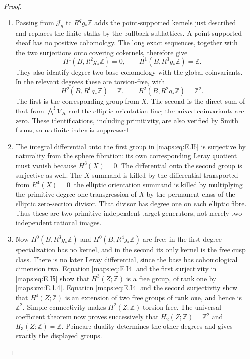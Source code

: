 \begin{proof}
\begin{enumerate}[label=\arabic*.,leftmargin=*]
\item Passing from \(\mathcal J_q\) to \(R^qg_*\mathbb Z\)
adds the point-supported kernels just described and replaces
the finite stalks by the pullback sublattices. A point-supported
sheaf has no positive cohomology. The long exact sequences,
together with the two surjections onto covering cokernels,
therefore give
\[
 H^1(B,R^2g_*\mathbb Z)=0,\qquad
 H^1(B,R^3g_*\mathbb Z)=\mathbb Z.
 \tag{E.I4}\label{maps:eq:E.I4}
\]
They also identify degree-two base cohomology with the global
coinvariants. In the relevant degrees these are torsion-free,
with
\[
 H^2(B,R^1g_*\mathbb Z)=\mathbb Z,
 \qquad H^2(B,R^2g_*\mathbb Z)=\mathbb Z^2.
 \tag{E.I5}\label{maps:eq:E.I5}
\]
The first is the corresponding group from \(X\). The second
is the direct sum of that from \(\bigwedge^2\mathcal V_X\)
and the elliptic orientation line; the mixed coinvariants are
zero. These identifications, including primitivity, are also
verified by Smith forms, so no finite index is suppressed.

\item The integral differential onto the first group in \eqref{maps:eq:E.I5} is
surjective by naturality from the sphere fibration: its own
corresponding Leray quotient must vanish because \(H^3(X)=0\).
The differential onto the second group is surjective as well.
The \(X\) summand is killed by the differential transported
from \(H^4(X)=0\); the elliptic orientation summand is killed
by multiplying the primitive degree-one transgression of \(X\)
by the permanent class of the elliptic zero-section divisor.
That divisor has degree one on each elliptic fibre. Thus these
are two primitive independent target generators, not merely two
independent rational images.

\item Now \(H^0(B,R^3g_*\mathbb Z)\) and
\(H^0(B,R^4g_*\mathbb Z)\) are free: in the first degree
specialization has no kernel, and in the second its only
kernel is the free cusp class. There is no later Leray
differential, since the base has cohomological dimension two.
Equation \eqref{maps:eq:E.I4} and the first surjectivity in \eqref{maps:eq:E.I5} show that
\(H^3(Z;\mathbb Z)\) is a free group, of rank one by \ref{maps:src:E.1.4}.
Equation \eqref{maps:eq:E.I4} and the second surjectivity show that
\(H^4(Z;\mathbb Z)\) is an extension of two free groups of
rank one, and hence is \(\mathbb Z^2\).
Simple connectivity makes \(H^2(Z;\mathbb Z)\) torsion free.
The universal coefficient theorem now proves successively that
\(H_2(Z;\mathbb Z)=\mathbb Z^2\) and
\(H_3(Z;\mathbb Z)=\mathbb Z\). Poincare duality determines
the other degrees and gives exactly the displayed groups.
\end{enumerate}
\end{proof}


